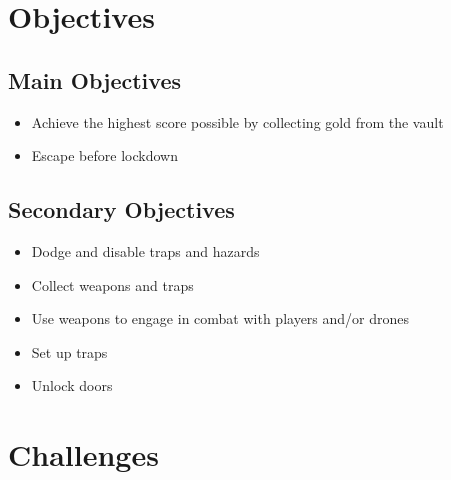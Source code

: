 \documentclass[14pt]{report}
\begin{document}

\section{Objectives}
\subsection{Main Objectives}
\begin{itemize}
    \item Achieve the highest score possible by collecting gold from the vault
    \item Escape before lockdown
\end{itemize}

\subsection{Secondary Objectives}
\begin{itemize}
    \item Dodge and disable traps and hazards
    \item Collect weapons and traps
    \item Use weapons to engage in combat with players and/or drones
    \item Set up traps
    \item Unlock doors
\end{itemize}

\section{Challenges}    
\end{document}
